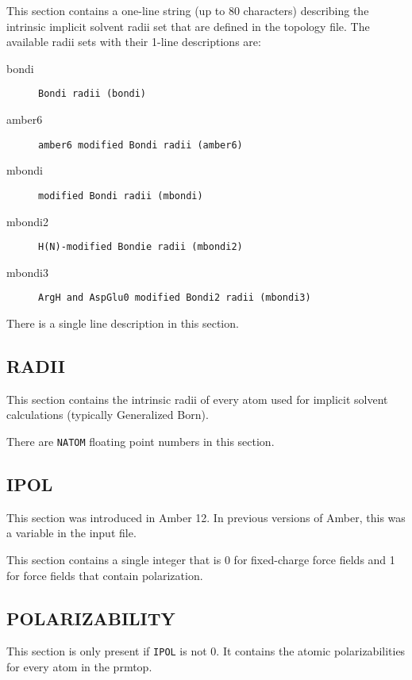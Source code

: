 This section contains a one-line string (up to 80 characters) describing the
intrinsic implicit solvent radii set that are defined in the topology file. The
available radii sets with their 1-line descriptions are:
\begin{description}
   \item[bondi] {\tt Bondi radii (bondi)}
   \item[amber6] {\tt amber6 modified Bondi radii (amber6)}
   \item[mbondi] {\tt modified Bondi radii (mbondi)}
   \item[mbondi2] {\tt H(N)-modified Bondie radii (mbondi2)}
   \item[mbondi3] {\tt ArgH and AspGlu0 modified Bondi2 radii (mbondi3)}
\end{description}


\noindent There is a single line description in this section.

\subsection*{RADII}

This section contains the intrinsic radii of every atom used for implicit
solvent calculations (typically Generalized Born).


\noindent There are {\tt NATOM} floating point numbers in this section.

\subsection*{IPOL}

This section was introduced in Amber 12. In previous versions of Amber, this was
a variable in the input file.

This section contains a single integer that is 0 for fixed-charge force fields
and 1 for force fields that contain polarization.

\subsection*{POLARIZABILITY}

This section is only present if {\tt IPOL} is not 0. It contains the atomic
polarizabilities for every atom in the prmtop.


